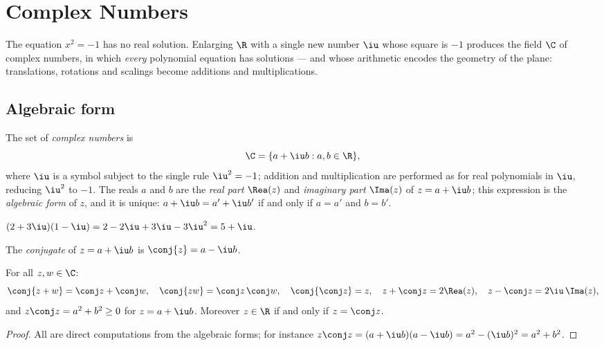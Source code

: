 \chapter{Complex Numbers}\label{ch:tle:complex}

The equation $x^2 = -1$ has no real solution. Enlarging $\R$ with a single
new number $\iu$ whose square is $-1$ produces the field $\C$ of complex
numbers, in which \emph{every} polynomial equation has solutions --- and
whose arithmetic encodes the geometry of the plane: translations, rotations
and scalings become additions and multiplications.

\section{Algebraic form}

\begin{definition}\label{def:tle:complex:def}
The set of \emph{complex numbers} is
\[
\C = \{a + \iu b : a, b \in \R\},
\]
where $\iu$ is a symbol subject to the single rule $\iu^2 = -1$; addition and
multiplication are performed as for real polynomials in $\iu$, reducing
$\iu^2$ to $-1$. The reals $a$ and $b$ are the \emph{real part}
$\Rea(z)$ and \emph{imaginary part} $\Ima(z)$ of $z = a + \iu b$; this
expression is the \emph{algebraic form} of $z$, and it is unique:
$a + \iu b = a' + \iu b'$ if and only if $a = a'$ and $b = b'$.
\end{definition}

\begin{example}
$(2 + 3\iu)(1 - \iu) = 2 - 2\iu + 3\iu - 3\iu^2 = 5 + \iu$.
\end{example}

\begin{definition}[Conjugate]\label{def:tle:complex:conjugate}
The \emph{conjugate} of $z = a + \iu b$ is
$\conj{z} = a - \iu b$.
\end{definition}

\begin{proposition}\label{prop:tle:complex:conjugate}
For all $z, w \in \C$:
\[
\conj{z + w} = \conj z + \conj w, \quad
\conj{zw} = \conj z\,\conj w, \quad
\conj{\conj z} = z, \quad
z + \conj z = 2\Rea(z), \quad
z - \conj z = 2\iu\,\Ima(z),
\]
and $z\conj z = a^2 + b^2 \geq 0$ for $z = a + \iu b$. Moreover $z \in \R$
if and only if $z = \conj z$.
\end{proposition}

\begin{proof}
All are direct computations from the algebraic forms; for instance
$z\conj z = (a + \iu b)(a - \iu b) = a^2 - (\iu b)^2 = a^2 + b^2$.
\end{proof}

